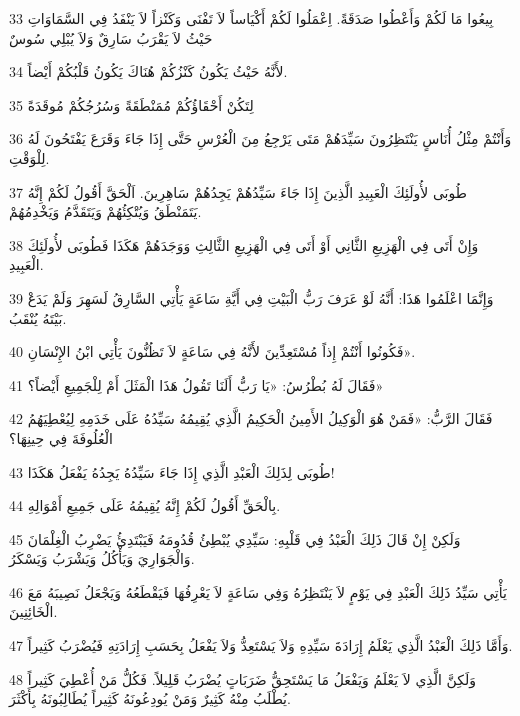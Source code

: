 \par 33 بِيعُوا مَا لَكُمْ وَأَعْطُوا صَدَقَةً. اِعْمَلُوا لَكُمْ أَكْيَاساً لاَ تَفْنَى وَكَنْزاً لاَ يَنْفَدُ فِي السَّمَاوَاتِ حَيْثُ لاَ يَقْرَبُ سَارِقٌ وَلاَ يُبْلِي سُوسٌ
\par 34 لأَنَّهُ حَيْثُ يَكُونُ كَنْزُكُمْ هُنَاكَ يَكُونُ قَلْبُكُمْ أَيْضاً.
\par 35 لِتَكُنْ أَحْقَاؤُكُمْ مُمَنْطَقَةً وَسُرُجُكُمْ مُوقَدَةً
\par 36 وَأَنْتُمْ مِثْلُ أُنَاسٍ يَنْتَظِرُونَ سَيِّدَهُمْ مَتَى يَرْجِعُ مِنَ الْعُرْسِ حَتَّى إِذَا جَاءَ وَقَرَعَ يَفْتَحُونَ لَهُ لِلْوَقْتِ.
\par 37 طُوبَى لأُولَئِكَ الْعَبِيدِ الَّذِينَ إِذَا جَاءَ سَيِّدُهُمْ يَجِدُهُمْ سَاهِرِينَ. اَلْحَقَّ أَقُولُ لَكُمْ إِنَّهُ يَتَمَنْطَقُ وَيُتْكِئُهُمْ وَيَتَقَدَّمُ وَيَخْدِمُهُمْ.
\par 38 وَإِنْ أَتَى فِي الْهَزِيعِ الثَّانِي أَوْ أَتَى فِي الْهَزِيعِ الثَّالِثِ وَوَجَدَهُمْ هَكَذَا فَطُوبَى لأُولَئِكَ الْعَبِيدِ.
\par 39 وَإِنَّمَا اعْلَمُوا هَذَا: أَنَّهُ لَوْ عَرَفَ رَبُّ الْبَيْتِ فِي أَيَّةِ سَاعَةٍ يَأْتِي السَّارِقُ لَسَهِرَ وَلَمْ يَدَعْ بَيْتَهُ يُنْقَبُ.
\par 40 فَكُونُوا أَنْتُمْ إِذاً مُسْتَعِدِّينَ لأَنَّهُ فِي سَاعَةٍ لاَ تَظُنُّونَ يَأْتِي ابْنُ الإِنْسَانِ».
\par 41 فَقَالَ لَهُ بُطْرُسُ: «يَا رَبُّ أَلَنَا تَقُولُ هَذَا الْمَثَلَ أَمْ لِلْجَمِيعِ أَيْضاً؟»
\par 42 فَقَالَ الرَّبُّ: «فَمَنْ هُوَ الْوَكِيلُ الأَمِينُ الْحَكِيمُ الَّذِي يُقِيمُهُ سَيِّدُهُ عَلَى خَدَمِهِ لِيُعْطِيَهُمُ الْعُلُوفَةَ فِي حِينِهَا؟
\par 43 طُوبَى لِذَلِكَ الْعَبْدِ الَّذِي إِذَا جَاءَ سَيِّدُهُ يَجِدُهُ يَفْعَلُ هَكَذَا!
\par 44 بِالْحَقِّ أَقُولُ لَكُمْ إِنَّهُ يُقِيمُهُ عَلَى جَمِيعِ أَمْوَالِهِ.
\par 45 وَلَكِنْ إِنْ قَالَ ذَلِكَ الْعَبْدُ فِي قَلْبِهِ: سَيِّدِي يُبْطِئُ قُدُومَهُ فَيَبْتَدِئُ يَضْرِبُ الْغِلْمَانَ وَالْجَوَارِيَ وَيَأْكُلُ وَيَشْرَبُ وَيَسْكَرُ.
\par 46 يَأْتِي سَيِّدُ ذَلِكَ الْعَبْدِ فِي يَوْمٍ لاَ يَنْتَظِرُهُ وَفِي سَاعَةٍ لاَ يَعْرِفُهَا فَيَقْطَعُهُ وَيَجْعَلُ نَصِيبَهُ مَعَ الْخَائِنِينَ.
\par 47 وَأَمَّا ذَلِكَ الْعَبْدُ الَّذِي يَعْلَمُ إِرَادَةَ سَيِّدِهِ وَلاَ يَسْتَعِدُّ وَلاَ يَفْعَلُ بِحَسَبِ إِرَادَتِهِ فَيُضْرَبُ كَثِيراً.
\par 48 وَلَكِنَّ الَّذِي لاَ يَعْلَمُ وَيَفْعَلُ مَا يَسْتَحِقُّ ضَرَبَاتٍ يُضْرَبُ قَلِيلاً. فَكُلُّ مَنْ أُعْطِيَ كَثِيراً يُطْلَبُ مِنْهُ كَثِيرٌ وَمَنْ يُودِعُونَهُ كَثِيراً يُطَالِبُونَهُ بِأَكْثَرَ.
